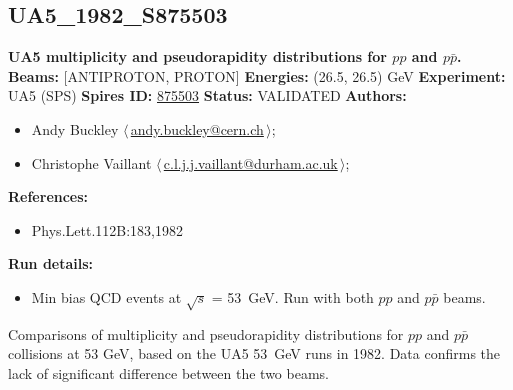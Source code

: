 \subsection[UA5\_1982\_S875503]{UA5\_1982\_S875503\,\cite{Alpgard:1982zx}}
\textbf{UA5 multiplicity and pseudorapidity distributions for $pp$ and $p\bar{p}$.}\newline
\textbf{Beams:} [ANTIPROTON, PROTON] \newline
\textbf{Energies:} (26.5, 26.5) GeV \newline
\textbf{Experiment:} UA5 (SPS) \newline
\textbf{Spires ID:} \href{http://www.slac.stanford.edu/spires/find/hep/www?rawcmd=key+875503}{875503}\newline
\textbf{Status:} VALIDATED\newline
\textbf{Authors:}
\begin{itemize}
  \item Andy Buckley $\langle\,$\href{mailto:andy.buckley@cern.ch}{andy.buckley@cern.ch}$\,\rangle$;
  \item Christophe Vaillant $\langle\,$\href{mailto:c.l.j.j.vaillant@durham.ac.uk}{c.l.j.j.vaillant@durham.ac.uk}$\,\rangle$;
\end{itemize}
\textbf{References:}
\begin{itemize}
  \item Phys.Lett.112B:183,1982
\end{itemize}
\textbf{Run details:}
\begin{itemize}

  \item Min bias QCD events at \ensuremath{\sqrt{s}} = 53~GeV. Run with both $pp$ and $p\bar{p}$ beams.\end{itemize}

\noindent Comparisons of multiplicity and pseudorapidity distributions for $pp$ and $p\bar{p}$ collisions at 53 GeV, based on the UA5 53~GeV runs in 1982. Data confirms the lack of significant difference between the two beams.

\clearpage


\clearpage

